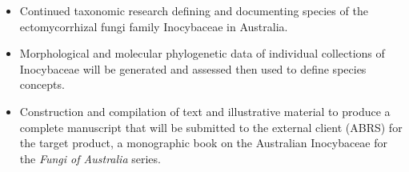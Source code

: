 \documentclass[version=last, paper=a4, DIV=18, usenames, dvipsnames]{scrartcl}
\begin{document}
\begin{itemize}

  \item Continued taxonomic research defining and documenting species of the ectomycorrhizal fungi family Inocybaceae in Australia.

  \item Morphological and molecular phylogenetic data of individual collections of Inocybaceae will be generated and assessed then used to define species concepts.

  \item Construction and compilation of text and illustrative material to produce a complete manuscript that will be submitted to the external client (ABRS) for the target product, a monographic book on the Australian Inocybaceae for the \emph{Fungi of Australia} series.

\end{itemize}






\clearpage
\end{document}
